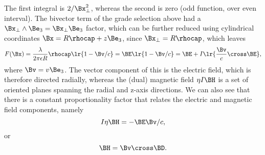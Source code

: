 The first integral is \( 2/\Bx_\perp^2 \), whereas the second is zero (odd function, over even interval).
The bivector term of the grade selection above had a \( \Bx_\perp \wedge \Be_3 = \Bx_\perp \Be_3 \) factor, which can be further reduced using cylindrical coordinates \( \Bx = R \rhocap + z \Be_3 \), since \( \Bx_\perp = R \rhocap \), which leaves
\begin{equation}\label{eqn:statics_infiniteLineCharge:180}
F(\Bx)
=
\frac{\lambda}{2\pi \epsilon R} \rhocap \lr{ 1 - \Bv/c} = \BE \lr{ 1 - \Bv/c }
= \BE + I \lr{ \frac{\Bv}{c} \cross \BE },
\end{equation}
where \( \Bv = v \Be_3 \).
The vector component of this is the electric field, which is therefore directed radially, whereas the (dual) magnetic field \( \eta I \BH \)
is a set of oriented planes spanning the radial and z-axis directions.
We can also see that there is a constant proportionality factor that relates the electric and magnetic field components, namely
\begin{equation}\label{eqn:statics_infiniteLineCharge:200}
I \eta \BH = -\BE \Bv/c,
\end{equation}
or
\begin{equation}\label{eqn:statics_infiniteLineCharge:220}
\BH = \Bv \cross \BD.
\end{equation}


